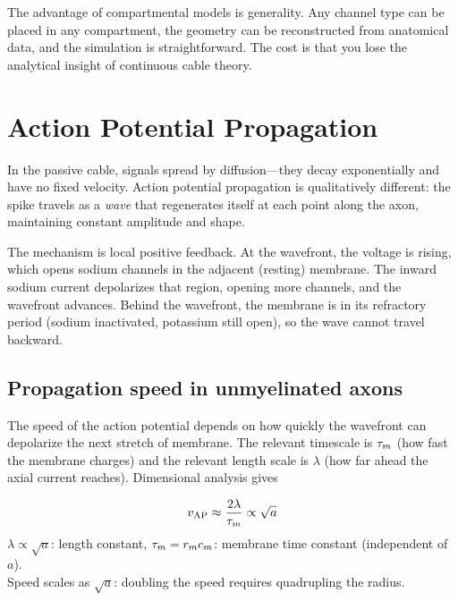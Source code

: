 The advantage of compartmental models is generality. Any channel type can be placed in any compartment, the geometry can be reconstructed from anatomical data, and the simulation is straightforward. The cost is that you lose the analytical insight of continuous cable theory.

\section{Action Potential Propagation}
\label{sec:ap-propagation}

In the passive cable, signals spread by diffusion---they decay exponentially and have no fixed velocity. Action potential propagation is qualitatively different: the spike travels as a \emph{wave} that regenerates itself at each point along the axon, maintaining constant amplitude and shape.

The mechanism is local positive feedback. At the wavefront, the voltage is rising, which opens sodium channels in the adjacent (resting) membrane. The inward sodium current depolarizes that region, opening more channels, and the wavefront advances. Behind the wavefront, the membrane is in its refractory period (sodium inactivated, potassium still open), so the wave cannot travel backward.

\subsection{Propagation speed in unmyelinated axons}

The speed of the action potential depends on how quickly the wavefront can depolarize the next stretch of membrane. The relevant timescale is $\tau_m$ (how fast the membrane charges) and the relevant length scale is $\lambda$ (how far ahead the axial current reaches). Dimensional analysis gives

\begin{keyequation}
\begin{equation}
  v_{\text{AP}} \approx \frac{2\lambda}{\tau_m} \propto \sqrt{a}
  \label{eq:ap-speed}
\end{equation}
\tcblower
$\lambda \propto \sqrt{a}$: length constant, \quad
$\tau_m = r_m c_m$: membrane time constant (independent of $a$). \\[4pt]
Speed scales as $\sqrt{a}$: doubling the speed requires quadrupling the radius.
\end{keyequation}

